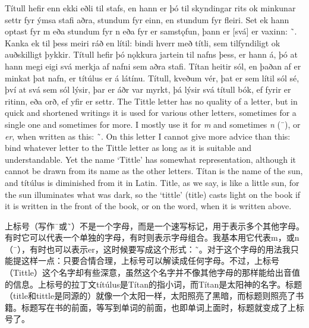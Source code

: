 \begin{paracol}{2}
    Títull hefir enn ekki eðli til stafs, en hann er þó til skyndingar rits ok minkunar settr fyr ýmsa stafi aðra, stundum fyr einn, en stundum fyr fleiri. Set ek hann optast fyr m eða stundum fyr n eða fyr er samstǫfun, þann er [svá] er vaxinn: ˜. Kanka ek til þess meiri ráð en lítil: bindi hverr með títli, sem tilfyndiligt ok auðskilligt þykkir. Títull hefir þó nǫkkura jartein til nafns þess, er hann á, þó at hann megi eigi svá merkja af nafni sem aðra stafi. Títan heitir sól, en þaðan af er minkat þat nafn, er títúlus er á látínu. Títull, kveðum vér, þat er sem lítil sól sé, því at svá sem sól lýsir, þar er áðr var myrkt, þá lýsir svá títull bók, ef fyrir er ritinn, eða orð, ef yfir er settr.
    \switchcolumn
    The Tittle letter has no quality of a letter, but in quick and shortened writings it is used for various other letters, sometimes for a single one and sometimes for more. I mostly use it for \textit{m} and sometimes \textit{n} (¯), or \textit{er}, when written as this: ˜. On this letter I cannot give more advice than this: bind whatever letter to the Tittle letter as long as it is suitable and understandable. Yet the name `Tittle' has somewhat representation, although it cannot be drawn from its name as the other letters. Títan is the name of the sun, and títúlus is diminished from it in Latin. Title, as we say, is like a little sun, for the sun illuminates what was dark, so the `tittle' (title) casts light on the book if it is written in the front of the book, or on the word, when it is written above.
\end{paracol}
\begin{translation*}{}
    上标号（写作¯或˜）不是一个字母，而是一个速写标记，用于表示多个其他字母。有时它可以代表一个单独的字母，有时则表示字母组合。我基本用它代表m，或n（¯），有时也可以表示er，这时候要写成这个形式：˜。对于这个字母的用法我只能提这样一点：只要合情合理，上标号可以解读成任何字母。不过，上标号（Tittle）这个名字却有些深意，虽然这个名字并不像其他字母的那样能给出音值的信息。上标号的拉丁文títúlus是Títan的指小词，而Títan是太阳神的名字。标题（title和tittle是同源的）就像一个太阳一样，太阳照亮了黑暗，而标题则照亮了书籍。标题写在书的前面，等写到单词的前面，也即单词上面时，标题就变成了上标号了。
\end{translation*}

